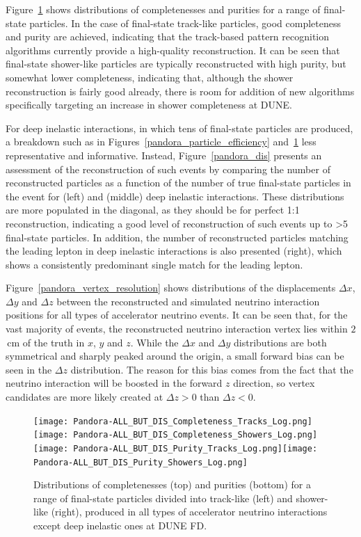 Figure~\ref{pandora_completeness_purity} shows distributions of completenesses and purities for a range of final-state particles. In the case of final-state track-like particles, good completeness and purity are %
achieved, indicating that the track-based pattern recognition algorithms currently provide a high-quality reconstruction. It can be seen that final-state shower-like particles are typically reconstructed with high purity, but somewhat lower completeness, indicating that, although the shower reconstruction is fairly good already, there is room for addition of new algorithms specifically targeting an increase in shower completeness at DUNE.

For deep inelastic interactions, in which tens of final-state particles are produced, a breakdown such as in Figures~\ref{pandora_particle_efficiency} and~\ref{pandora_completeness_purity}  less representative and informative. Instead, Figure~\ref{pandora_dis} presents an assessment of the reconstruction of such events %
by comparing the number of reconstructed particles as a function of the number of true final-state particles in the event for  (left) and  (middle) deep inelastic interactions. These distributions are more populated in the diagonal, as they should be for perfect 1:1 reconstruction, indicating a good level of reconstruction of such events up to >5 final-state particles. In addition, the number of reconstructed particles matching the leading lepton in  deep inelastic interactions is also presented (right), which shows a consistently predominant single match for the leading lepton. 

Figure~\ref{pandora_vertex_resolution} shows distributions of the displacements $\Delta x$, $\Delta y$ and $\Delta z$ between the reconstructed and simulated neutrino interaction positions for all types of accelerator neutrino events. It can be seen that, for the vast majority of events, the reconstructed neutrino  interaction vertex lies within $2$\,cm of the  truth in $x$, $y$ and $z$. While the $\Delta x$ and $\Delta y$ distributions are both symmetrical and sharply peaked around the origin, a small forward bias can be seen in the $\Delta z$ distribution. The reason for this bias comes from the fact that the neutrino interaction will be boosted in the forward $z$ direction, so vertex candidates are more likely created at $\Delta z>0$ than $\Delta z<0$.  

\begin{figure}[!ht]
\centering
\texttt{[image: Pandora-ALL\_BUT\_DIS\_Completeness\_Tracks\_Log.png]}\texttt{[image: Pandora-ALL\_BUT\_DIS\_Completeness\_Showers\_Log.png]}
\texttt{[image: Pandora-ALL\_BUT\_DIS\_Purity\_Tracks\_Log.png]}\texttt{[image: Pandora-ALL\_BUT\_DIS\_Purity\_Showers\_Log.png]}
\caption[Completeness (top) and purities (bottom) for a range of final-state track-like  and shower-like particles]{Distributions of completenesses (top) and purities (bottom) for a range of final-state particles divided into track-like (left) and shower-like (right), produced in all types of accelerator neutrino interactions except deep inelastic ones at DUNE FD. }
\label{pandora_completeness_purity}
\end{figure}

